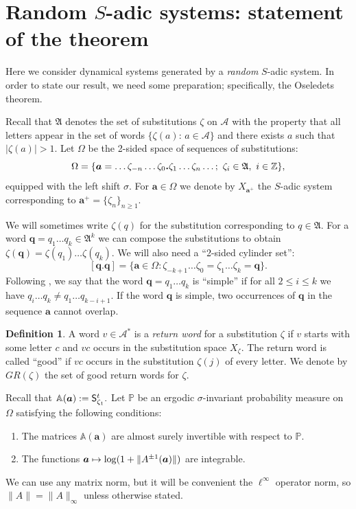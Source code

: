 \documentclass[JEP,XML,SOM,Unicode]{cedram}
\let\mathcal\mathscr
\def\mto{\mathchoice{\longmapsto}{\mapsto}{\mapsto}{\mapsto}}
\newcommand{\sep}{:}
\theoremstyle{plain}
\theoremstyle{definition}
\newtheorem{defi}[theorem]{Definition}
\newcommand\bom{{\boldsymbol a}}\let\ba\bom
\newcommand\bq{{\boldsymbol q}}
\let\Om\Omega
\let\sig\sigma
\newcommand\FrA{\mathfrak{A}}
\newcommand\Ak{\mathcal{A}}
\newcommand\Aa{\mathbb{A}}
\newcommand{\Z}{\mathbb{Z}}
\renewcommand{\P}{\mathbb{P}}
\newcommand\Sf{{\sf S}}
\begin{document}
\section{Random \texorpdfstring{$S$}{S}-adic systems: statement of the theorem}\label{sec:3}

Here we consider dynamical systems generated by a \emph{random} $S$-adic system. In order to state our result, we need some preparation; specifically, the Oseledets theorem.

Recall that $\FrA$ denotes the set of substitutions $\zeta$ on $\Ak$ with the property that all letters appear in the set of words $\{\zeta(a):\,a\in \Ak\}$ and there exists $a$ such that $|\zeta(a)|>1$.
Let $\Om$ be the 2-sided space of sequences of substitutions:
\[
\Om = \{\bom = \ldots \zeta_{-n}\ldots\zeta_0{\text{\bf .}}\zeta_1\ldots \zeta_n\ldots;\ \zeta_i \in \FrA,\ i\in \Z\},
\]
equipped with the left shift $\sig$.
For $\bom\in\Om$ we denote by $X_{\bom^+}$ the $S$-adic system corresponding to $\bom^+=\{\zeta_n\}_{n\ge 1}$.

We will sometimes write $\zeta(q)$ for the substitution corresponding to $q\in \FrA$. For a word $\bq = q_1\ldots q_k\in \FrA^k$ we can compose the substitutions to obtain
$\zeta(\bq) = \zeta(q_1)\ldots \zeta(q_k)$.
We will also need a ``2-sided cylinder set'':\vspace*{-3pt}
\[
[\bq.\bq] = \{\bom\in \Om\sep \zeta_{-k+1}\ldots\zeta_0 = \zeta_1\ldots\zeta_k = \bq\}.
\]
Following \cite{BufGur}, we say that the word $\bq = q_1\ldots q_k$ is ``simple'' if for all $2 \le i \le k$ we have $q_i\ldots q_k \ne q_1\ldots q_{k-i+1}$. If the word $\bq$ is simple, two occurrences of $\bq$ in the sequence
$\bom$ cannot overlap.

\begin{defi}
A word $v\in \Ak^*$ is a \emph{return word} for a substitution $\zeta$ if $v$ starts with some letter $c$ and $vc$ occurs in the substitution space $X_\zeta$. The return word is called ``good'' if $vc$ occurs in the substitution $\zeta(j)$ of every letter. We denote by $GR(\zeta)$ the set of good return words for $\zeta$.
\end{defi}

Recall that
$
\Aa(\bom) := \Sf^t_{\zeta_1}.
$
Let $\P$ be an ergodic $\sig$-invariant probability measure on $\Om$ satisfying the following conditions:
\begin{enumerate}\renewcommand{\theenumi}{C\arabic{enumi}}
\item\label{C1}
The matrices $\Aa(\bom)$ are almost surely invertible with respect to $\P$.

\item\label{C2}
The functions $\bom\mto \log(1+ \|A^{\pm 1}(\bom)\|)$ are integrable.
\end{enumerate}
We can use any matrix norm, but it will be convenient the $\ell^\infty$ operator norm, so
$\|A\|=\|A\|_\infty$ unless otherwise stated.
\end{document}
